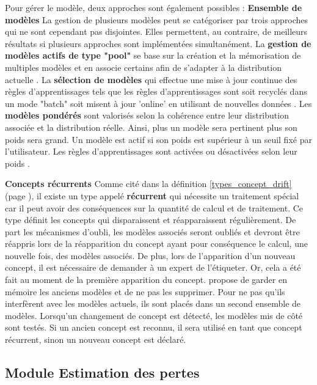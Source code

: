 \documentclass[utf8]{stageM2R} %
\theoremstyle{remark}
\renewcommand{\emph}{\textbf}
\begin{document}
Pour gérer le modèle, deux approches sont également possibles :
 \textbf{Ensemble de modèles} La gestion de plusieurs modèles peut se catégoriser par trois approches qui ne sont cependant pas disjointes. Elles permettent, au contraire, de meilleurs résultats si plusieurs approches sont implémentées simultanément.
La \emph{gestion de modèles actifs de type "pool"} se base sur la création et la mémorisation de multiples modèles et en associe certains afin de s'adapter à la distribution actuelle \cite{Tsymbal2008}.
La \emph{sélection de modèles} qui effectue une mise à jour continue des règles d'apprentissages tels que les règles d'apprentissages sont soit recyclés dans un mode "batch" soit misent à jour 'online' en utilisant de nouvelles données \cite{Fern2003}.
Les \emph{modèles pondérés} sont valorisés selon la cohérence entre leur distribution associée et la distribution réelle. Ainsi, plus un modèle sera pertinent plus son poids sera grand. Un  modèle est actif si son poids est supérieur à un seuil fixé par l'utilisateur. Les règles d'apprentissages sont activées ou désactivées selon leur poids \cite{Kolter2003}.

 \textbf{Concepts récurrents}
Comme cité dans la définition \ref{types_concept_drift} (page \pageref{types_concept_drift}), il existe un type appelé \emph{récurrent} qui nécessite un traitement spécial car il peut avoir des conséquences sur la quantité de calcul et de traitement. Ce type définit les concepts qui disparaissent et réapparaissent régulièrement. De part les mécanismes d'oubli, les modèles associés seront oubliés et devront être réappris lors de la réapparition du concept ayant pour conséquence le calcul, une nouvelle fois, des modèles associés. De plus, lors de l'apparition d'un nouveau concept, il est nécessaire de demander à un expert de l'étiqueter. Or, cela a été fait au moment de la première apparition du concept. \cite{Masud2011} propose de garder en mémoire les anciens modèles et de ne pas les supprimer. Pour ne pas qu'ils interfèrent avec les modèles actuels, ils sont placés dans un second ensemble de modèles. Lorsqu'un changement de concept est détecté, les modèles mis de côté sont testés. Si un ancien concept est reconnu, il sera utilisé en tant que concept récurrent, sinon un nouveau concept est déclaré.

\subsection{Module Estimation des pertes}
\label{estimation_de_pertes}
\end{document}
